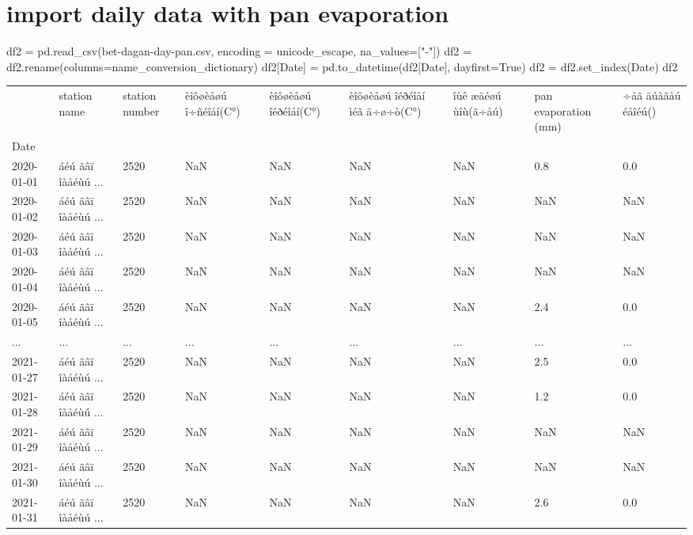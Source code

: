 \documentclass[
  letterpaper,
  DIV=11,
  numbers=noendperiod]{scrreprt}
\newenvironment{Shaded}{\begin{snugshade}}{\end{snugshade}}
\newcommand{\NormalTok}[1]{\textcolor[rgb]{0.00,0.23,0.31}{#1}}
\newcommand{\OperatorTok}[1]{\textcolor[rgb]{0.37,0.37,0.37}{#1}}
\newcommand{\StringTok}[1]{\textcolor[rgb]{0.13,0.47,0.30}{#1}}
\newcommand{\VariableTok}[1]{\textcolor[rgb]{0.07,0.07,0.07}{#1}}
\begin{document}
\hypertarget{import-daily-data-with-pan-evaporation}{%
\section{import daily data with pan
evaporation}\label{import-daily-data-with-pan-evaporation}}

\begin{Shaded}
\begin{Highlighting}[]
\NormalTok{df2 }\OperatorTok{=}\NormalTok{ pd.read\_csv(}\StringTok{\textquotesingle{}bet{-}dagan{-}day{-}pan.csv\textquotesingle{}}\NormalTok{, encoding }\OperatorTok{=} \StringTok{\textquotesingle{}unicode\_escape\textquotesingle{}}\NormalTok{, na\_values}\OperatorTok{=}\NormalTok{[}\StringTok{"{-}"}\NormalTok{])}
\NormalTok{df2 }\OperatorTok{=}\NormalTok{ df2.rename(columns}\OperatorTok{=}\NormalTok{name\_conversion\_dictionary)}
\NormalTok{df2[}\StringTok{\textquotesingle{}Date\textquotesingle{}}\NormalTok{] }\OperatorTok{=}\NormalTok{ pd.to\_datetime(df2[}\StringTok{\textquotesingle{}Date\textquotesingle{}}\NormalTok{], dayfirst}\OperatorTok{=}\VariableTok{True}\NormalTok{)}
\NormalTok{df2 }\OperatorTok{=}\NormalTok{ df2.set\_index(}\StringTok{\textquotesingle{}Date\textquotesingle{}}\NormalTok{)}
\NormalTok{df2}
\end{Highlighting}
\end{Shaded}

\begin{longtable}[]{@{}lllllllll@{}}
\toprule()
& station name & station number & èîôøèåøú î÷ñéîåí(C°) & èîôøèåøú
îéðéîåí(C°) & èîôøèåøú îéðéîåí ìéã ä÷ø÷ò(C°) & îùê æäéøú ùîù(ã÷åú) & pan
evaporation (mm) & ÷åã äúàãåú éåîéú() \\
Date & & & & & & & & \\
\midrule()
\endhead
2020-01-01 & áéú ãâï îàåéùú ... & 2520 & NaN & NaN & NaN & NaN & 0.8 &
0.0 \\
2020-01-02 & áéú ãâï îàåéùú ... & 2520 & NaN & NaN & NaN & NaN & NaN &
NaN \\
2020-01-03 & áéú ãâï îàåéùú ... & 2520 & NaN & NaN & NaN & NaN & NaN &
NaN \\
2020-01-04 & áéú ãâï îàåéùú ... & 2520 & NaN & NaN & NaN & NaN & NaN &
NaN \\
2020-01-05 & áéú ãâï îàåéùú ... & 2520 & NaN & NaN & NaN & NaN & 2.4 &
0.0 \\
... & ... & ... & ... & ... & ... & ... & ... & ... \\
2021-01-27 & áéú ãâï îàåéùú ... & 2520 & NaN & NaN & NaN & NaN & 2.5 &
0.0 \\
2021-01-28 & áéú ãâï îàåéùú ... & 2520 & NaN & NaN & NaN & NaN & 1.2 &
0.0 \\
2021-01-29 & áéú ãâï îàåéùú ... & 2520 & NaN & NaN & NaN & NaN & NaN &
NaN \\
2021-01-30 & áéú ãâï îàåéùú ... & 2520 & NaN & NaN & NaN & NaN & NaN &
NaN \\
2021-01-31 & áéú ãâï îàåéùú ... & 2520 & NaN & NaN & NaN & NaN & 2.6 &
0.0 \\
\bottomrule()
\end{longtable}
\end{document}
